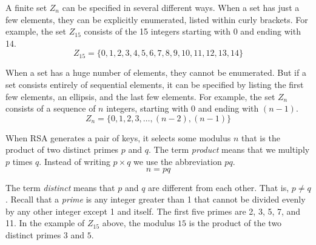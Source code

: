 
A finite set $Z_n$ can be specified in several different ways.
When a set has just a few elements, they can be explicitly enumerated, listed within curly brackets.
For example, the set $Z_{15}$ consists of the 15 integers starting with 0 and ending with 14.
\[  Z_{15} = \{0,1,2,3,4,5,6,7,8,9,10,11,12,13,14\}  \]

When a set has a huge number of elements, they cannot be enumerated.
But if a set consists entirely of sequential elements, it can be specified
by listing the first few elements, an ellipsis, and the last few elements.
For example, the set $Z_n$ consists of a sequence of $n$ integers,
starting with 0 and ending with $(n-1)$.
\[  Z_n = \{0,1,2,3,\ldots,(n-2),(n-1)\}  \]

When RSA generates a pair of keys, it selects some modulus $n$ 
that is the product of two distinct primes $p$ and $q$.
The term \emph{product} means that we multiply $p$ times $q$.
Instead of writing $p \times q$ we use the abbreviation $pq$.
\[  n = pq  \]

The term \emph{distinct} means that $p$ and $q$ are different from each other.
That is, $p \ne q$.
Recall that a \emph{prime} is any integer greater than 1
that cannot be divided evenly by any other integer except 1 and itself.
The first five primes are 2, 3, 5, 7, and 11.
In the example of $Z_{15}$ above, the modulus $15$ is 
the product of the two distinct primes $3$ and $5$.

